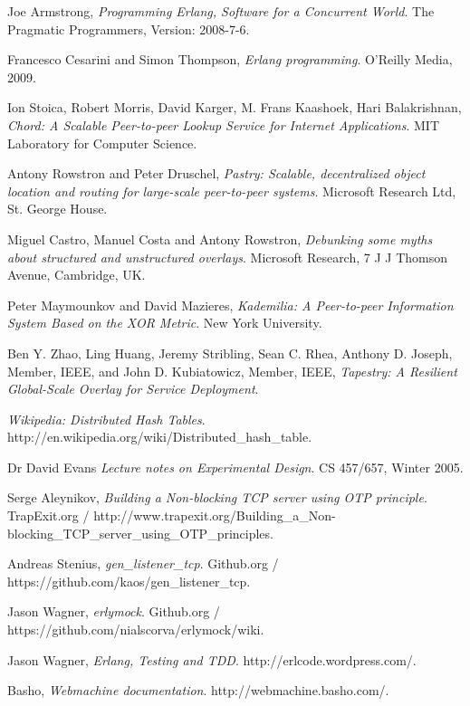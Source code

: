 \begin{thebibliography}{9}

  Joe Armstrong,
  \emph{Programming Erlang, Software for a Concurrent World}.
  The Pragmatic Programmers,
  Version: 2008-7-6.

  Francesco Cesarini and Simon Thompson,
  \emph{Erlang programming}.
  O'Reilly Media,
  2009.

  Ion Stoica, Robert Morris, David Karger, M. Frans Kaashoek, Hari Balakrishnan,
  \emph{Chord: A Scalable Peer-to-peer Lookup Service for Internet Applications}.
  MIT Laboratory for Computer Science.

  Antony Rowstron	and Peter Druschel,
  \emph{Pastry: Scalable, decentralized object location and routing for large-scale peer-to-peer systems}.
  Microsoft Research Ltd, St. George House.

  Miguel Castro, Manuel Costa and Antony Rowstron,
  \emph{Debunking some myths about structured and unstructured overlays}.
  Microsoft Research, 7 J J Thomson Avenue, Cambridge, UK.

  Peter Maymounkov and David Mazieres,
  \emph{Kademilia: A Peer-to-peer Information System Based on the XOR Metric}.
  New York University.

  Ben Y. Zhao, Ling Huang, Jeremy Stribling, Sean C. Rhea, Anthony D. Joseph, Member, IEEE, and John D. Kubiatowicz, Member, IEEE,
  \emph{Tapestry: A Resilient Global-Scale Overlay for Service Deployment}.

  \emph{Wikipedia: Distributed Hash Tables}.
  http://en.wikipedia.org/wiki/Distributed\_hash\_table.
  
  Dr David Evans
  \emph{Lecture notes on Experimental Design}.
  CS 457/657,	Winter 2005.

  Serge Aleynikov,
  \emph{Building a Non-blocking TCP server using OTP principle}.
  TrapExit.org / http://www.trapexit.org/Building\_a\_Non-blocking\_TCP\_server\_using\_OTP\_principles.

  Andreas Stenius,
  \emph{gen\_listener\_tcp}.
  Github.org / https://github.com/kaos/gen\_listener\_tcp.

  Jason Wagner,
  \emph{erlymock}.
  Github.org / https://github.com/nialscorva/erlymock/wiki.

  Jason Wagner,
  \emph{Erlang, Testing and TDD}.
  http://erlcode.wordpress.com/.

  Basho,
  \emph{Webmachine documentation}.
  http://webmachine.basho.com/.

\end{thebibliography}
